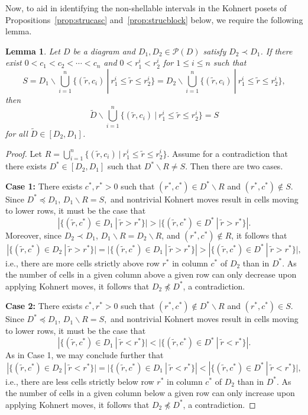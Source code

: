 \documentclass[letterpaper,10pt]{article}
\newtheorem{lemma}[theorem]{Lemma}
\begin{document}
Now, to aid in identifying the non-shellable intervals in the Kohnert posets of Propositions~\ref{prop:strucasc} and~\ref{prop:strucblock} below, we require the following lemma.

\begin{lemma}\label{lem:strucprophelp}
    Let $D$ be a diagram and $D_1,D_2\in \mathcal{P}(D)$ satisfy $D_2\prec D_1$. If there exist $0<c_1<c_2<\cdots<c_n$ and $0<r^i_1<r^i_2$ for $1\le i\le n$ such that $$S=D_1\backslash\bigcup_{i=1}^n\{(\tilde{r},c_i)~|~r^i_1\le \tilde{r}\le r^i_2\}=D_2\backslash\bigcup_{i=1}^n\{(\tilde{r},c_i)~|~r^i_1\le \tilde{r}\le r^i_2\},$$ then $$\tilde{D}\backslash\bigcup_{i=1}^n\{(\tilde{r},c_i)~|~r^i_1\le \tilde{r}\le r^i_2\}=S$$ for all $\tilde{D}\in [D_2,D_1]$.
\end{lemma}
\begin{proof}
    Let $R=\bigcup_{i=1}^n\{(\tilde{r},c_i)~|~r^i_1\le \tilde{r}\le r^i_2\}$. Assume for a contradiction that there exists $D^*\in [D_2,D_1]$ such that $D^*\backslash R\neq S$. Then there are two cases.
    \bigskip

    \noindent
    \textbf{Case 1:} There exists $c^*,r^*>0$ such that $(r^*,c^*)\in D^*\backslash R$ and $(r^*,c^*)\notin S$. Since $D^*\preceq D_1$, $D_1\backslash R=S,$ and nontrivial Kohnert moves result in cells moving to lower rows, it must be the case that $$|\{(\tilde{r},c^*)\in D_1~|~\tilde{r}>r^*\}|>|\{(\tilde{r},c^*)\in D^*~|~\tilde{r}>r^*\}|.$$ Moreover, since $D_2\prec D_1$, $D_1\backslash R=D_2\backslash R$, and $(r^*,c^*)\notin R$, it follows that $$|\{(\tilde{r},c^*)\in D_2~|~\tilde{r}>r^*\}|=|\{(\tilde{r},c^*)\in D_1~|~\tilde{r}>r^*\}|>|\{(\tilde{r},c^*)\in D^*~|~\tilde{r}>r^*\}|,$$ i.e., there are more cells strictly above row $r^*$ in column $c^*$ of $D_2$ than in $D^*$. As the number of cells in a given column above a given row can only decrease upon applying Kohnert moves, it follows that $D_2\not\preceq D^*$, a contradiction.
    \bigskip

    \noindent
    \textbf{Case 2:} There exists $c^*,r^*>0$ such that $(r^*,c^*)\notin D^*\backslash R$ and $(r^*,c^*)\in S$. Since $D^*\preceq D_1$, $D_1\backslash R=S,$ and nontrivial Kohnert moves result in cells moving to lower rows, it must be the case that $$|\{(\tilde{r},c^*)\in D_1~|~\tilde{r}< r^*\}|<|\{(\tilde{r},c^*)\in D^*~|~\tilde{r}<r^*\}|.$$ As in Case 1, we may conclude further that $$|\{(\tilde{r},c^*)\in D_2~|~\tilde{r}< r^*\}|=|\{(\tilde{r},c^*)\in D_1~|~\tilde{r}< r^*\}|<|\{(\tilde{r},c^*)\in D^*~|~\tilde{r}<r^*\}|,$$ i.e., there are less cells strictly below row $r^*$ in column $c^*$ of $D_2$ than in $D^*$. As the number of cells in a given column below a given row can only increase upon applying Kohnert moves, it follows that $D_2\not\preceq D^*$, a contradiction.
\end{proof}
\end{document}
